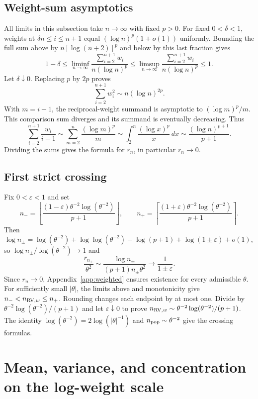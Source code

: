 \documentclass[11pt]{article}
\theoremstyle{definition}
\begin{document}
\subsection{Weight-sum asymptotics}\label{app:sums}
All limits in this subsection take $n\to\infty$ with fixed $p>0$.
For fixed $0<\delta<1$, weights at $\delta n\le i\le n+1$ equal
$(\log n)^p(1+o(1))$ uniformly. Bounding the full sum above by
$n[\log(n+2)]^p$ and below by this last fraction gives
\[
1-\delta\le\liminf_{n\to\infty}
\frac{\sum_{i=2}^{n+1}w_i}{n(\log n)^p}
\le\limsup_{n\to\infty}
\frac{\sum_{i=2}^{n+1}w_i}{n(\log n)^p}\le1.
\]
Let $\delta\downarrow0$. Replacing $p$ by $2p$ proves
\[
\sum_{i=2}^{n+1}w_i^2\sim n(\log n)^{2p}.
\]
With $m=i-1$, the reciprocal-weight
summand is asymptotic to $(\log m)^p/m$. This comparison sum
diverges and its summand is eventually decreasing. Thus
\[
\sum_{i=2}^{n+1}\frac{w_i}{i-1}
\sim\sum_{m=2}^n\frac{(\log m)^p}{m}
\sim\int_2^n\frac{(\log x)^p}{x}\,dx
\sim\frac{(\log n)^{p+1}}{p+1}.
\]
Dividing the sums gives the formula for $r_n$, in particular $r_n\to0$.

\subsection{First strict crossing}\label{app:crossing}
Fix $0<\varepsilon<1$ and set
\[
n_-=\left\lfloor
\frac{(1-\varepsilon)\theta^{-2}\log(\theta^{-2})}{p+1}
\right\rfloor,\qquad
n_+=\left\lceil
\frac{(1+\varepsilon)\theta^{-2}\log(\theta^{-2})}{p+1}
\right\rceil.
\]
Then
\[
\log n_\pm=\log(\theta^{-2})+\log\log(\theta^{-2})
-\log(p+1)+\log(1\pm\varepsilon)+o(1),
\]
so $\log n_\pm/\log(\theta^{-2})\to1$ and
\[
\frac{r_{n_\pm}}{\theta^2}
\sim\frac{\log n_\pm}{(p+1)n_\pm\theta^2}
\longrightarrow\frac1{1\pm\varepsilon}.
\]
Since $r_n\to0$, Appendix~\ref{app:weighted} ensures existence for
every admissible $\theta$. For sufficiently small $|\theta|$, the
limits above and monotonicity give $n_-<n_{{\rm RV},w}\le n_+$.
Rounding changes each endpoint by at most one. Divide by
$\theta^{-2}\log(\theta^{-2})/(p+1)$ and let
$\varepsilon\downarrow0$ to prove
$n_{{\rm RV},w}\sim\theta^{-2}\log(\theta^{-2})/(p+1)$.
The identity $\log(\theta^{-2})=2\log(|\theta|^{-1})$ and
$n_{\rm pop}\sim\theta^{-2}$ give the crossing formulas.

\section{Mean, variance, and concentration on the log-weight scale}
\end{document}
